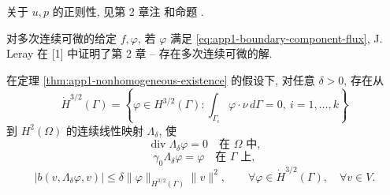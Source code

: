 \begin{Remark}
\label{rem:app1-solution-regularity-reference}
关于 $u,p$ 的正则性, 见第 2 章注  和命题 .
\end{Remark}

\begin{Remark}
\label{rem:app1-leray-smooth-solutions}
对多次连续可微的给定 $f,\varphi$, 若 $\varphi$ 满足 \eqref{eq:app1-boundary-component-flux}, J. Leray 在 [1] 中证明了第 2 章 -- 存在多次连续可微的解.
\end{Remark}

\begin{Proposition}
\label{prop:app1-boundary-lifting}
在定理 \ref{thm:app1-nonhomogeneous-existence} 的假设下, 对任意 $\delta>0$, 存在从
\begin{equation}
\dot H^{3/2}(\Gamma)
=\left\{\varphi\in H^{3/2}(\Gamma):
\int_{\Gamma_i}\varphi\cdot\nu\,d\Gamma=0,
\ i=1,\ldots,k\right\}
\label{eq:app1-boundary-lifting-domain}
\end{equation}
到 $H^2(\Omega)$ 的连续线性映射 $\Lambda_\delta$, 使
\begin{equation}
\operatorname{div}\Lambda_\delta\varphi=0
\quad\text{在 }\Omega\text{ 中},
\label{eq:app1-boundary-lifting-divergence}
\end{equation}
\begin{equation}
\gamma_0\Lambda_\delta\varphi=\varphi
\quad\text{在 }\Gamma\text{ 上},
\label{eq:app1-boundary-lifting-trace}
\end{equation}
\begin{equation}
|b(v,\Lambda_\delta\varphi,v)|
\leq\delta\lVert\varphi\rVert_{H^{3/2}(\Gamma)}\lVert v\rVert^2,
\qquad\forall\varphi\in\dot H^{3/2}(\Gamma),
\quad\forall v\in V.
\label{eq:app1-boundary-lifting-trilinear}
\end{equation}
\end{Proposition}

